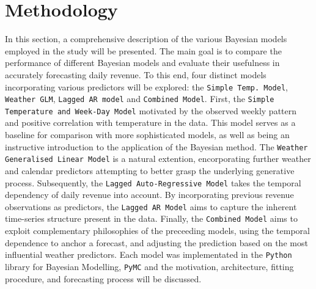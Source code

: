 \section{Methodology}

In this section, a comprehensive description of the various Bayesian models
employed in the study will be presented. The main goal is to compare the
performance of different Bayesian models and evaluate their usefulness in
accurately forecasting daily revenue. To this end, four distinct models
incorporating various predictors will be explored: the \texttt{Simple Temp.
Model}, \texttt{Weather GLM}, \texttt{Lagged AR model} and \texttt{Combined
Model}.
First, the \texttt{Simple Temperature and Week-Day Model} motivated by the
observed weekly pattern and positive correlation with temperature in the data.
This model serves as a baseline for comparison with more sophisticated models,
as well as being an instructive introduction to the application of the Bayesian
method.
The \texttt{Weather Generalised Linear Model} is a natural extention,
encorporating further weather and calendar predictors attempting to better
grasp the underlying generative process.
Subsequently, the \texttt{Lagged Auto-Regressive Model} takes the temporal
dependency of daily revenue into account. By incorporating previous revenue
observations as predictors, the \texttt{Lagged AR Model} aims to capture the
inherent time-series structure present in the data.
Finally, the \texttt{Combined Model} aims to exploit complementary philosophies
of the preceeding models, using the temporal dependence to anchor a forecast,
and adjusting the prediction based on the most influential weather predictors.
Each model was implementated in the \texttt{Python} library for Bayesian
Modelling, \texttt{PyMC} and the motivation, architecture, fitting
procedure, and forecasting process will be discussed. 

